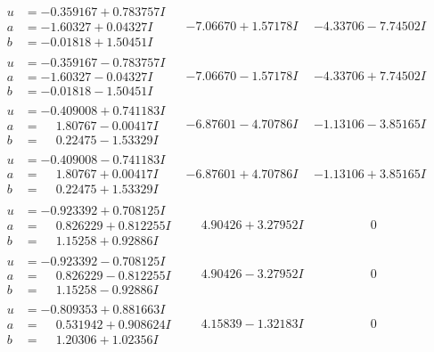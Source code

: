 \documentclass[1p]{elsarticle_modified}
\theoremstyle{definition}
\begin{document}
$$\begin{array}{c|c|c}
\begin{aligned}
u &= -0.359167 + 0.783757 I \\
a &= -1.60327 + 0.04327 I \\
b &= -0.01818 + 1.50451 I\end{aligned}
 & -7.06670 + 1.57178 I & -4.33706 - 7.74502 I \\ \hline\begin{aligned}
u &= -0.359167 - 0.783757 I \\
a &= -1.60327 - 0.04327 I \\
b &= -0.01818 - 1.50451 I\end{aligned}
 & -7.06670 - 1.57178 I & -4.33706 + 7.74502 I \\ \hline\begin{aligned}
u &= -0.409008 + 0.741183 I \\
a &= \phantom{-}1.80767 - 0.00417 I \\
b &= \phantom{-}0.22475 - 1.53329 I\end{aligned}
 & -6.87601 - 4.70786 I & -1.13106 - 3.85165 I \\ \hline\begin{aligned}
u &= -0.409008 - 0.741183 I \\
a &= \phantom{-}1.80767 + 0.00417 I \\
b &= \phantom{-}0.22475 + 1.53329 I\end{aligned}
 & -6.87601 + 4.70786 I & -1.13106 + 3.85165 I \\ \hline\begin{aligned}
u &= -0.923392 + 0.708125 I \\
a &= \phantom{-}0.826229 + 0.812255 I \\
b &= \phantom{-}1.15258 + 0.92886 I\end{aligned}
 & \phantom{-}4.90426 + 3.27952 I & \phantom{-0.000000 } 0 \\ \hline\begin{aligned}
u &= -0.923392 - 0.708125 I \\
a &= \phantom{-}0.826229 - 0.812255 I \\
b &= \phantom{-}1.15258 - 0.92886 I\end{aligned}
 & \phantom{-}4.90426 - 3.27952 I & \phantom{-0.000000 } 0 \\ \hline\begin{aligned}
u &= -0.809353 + 0.881663 I \\
a &= \phantom{-}0.531942 + 0.908624 I \\
b &= \phantom{-}1.20306 + 1.02356 I\end{aligned}
 & \phantom{-}4.15839 - 1.32183 I & \phantom{-0.000000 } 0 \\ \hline\begin{aligned}

\end{aligned}
\end{array}$$
\end{document}
